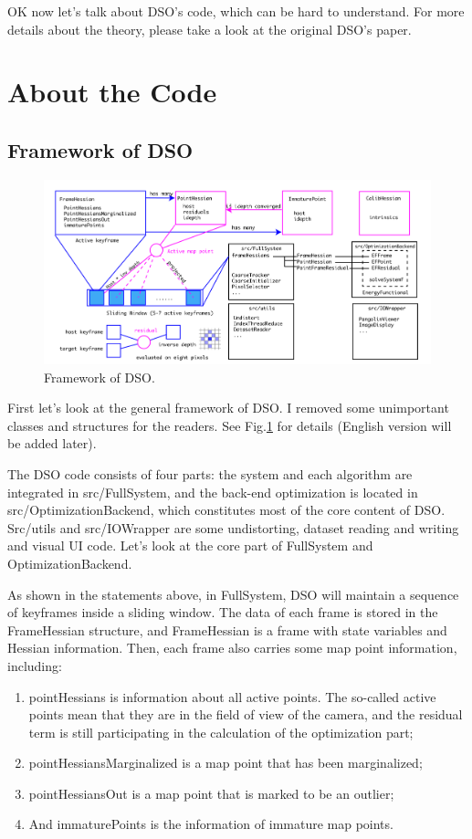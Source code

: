 \documentclass[a4paper,10pt]{article}
\begin{document}
	OK now let's talk about DSO's code, which can be hard to understand. For more details about the theory, please take a look at the original DSO's paper.
	
	\section{About the Code}
	\subsection{Framework of DSO}
	\begin{figure}[htp]
	\centering
	\includegraphics[width=1.0\textwidth]{figs/framework-dso-en}
	\caption{Framework of DSO.}
	\label{fig:framework-dso}
	\end{figure}
	First let's look at the general framework of DSO. I removed some unimportant classes and structures for the readers. See Fig.\ref{fig:framework-dso} for details (English version will be added later).
	
	The DSO code consists of four parts: the system and each algorithm are integrated in src/FullSystem, and the back-end optimization is located in src/OptimizationBackend, which constitutes most of the core content of DSO. Src/utils and src/IOWrapper are some undistorting, dataset reading and writing and visual UI code. Let's look at the core part of FullSystem and OptimizationBackend.
	
	As shown in the statements above, in FullSystem, DSO will maintain a sequence of keyframes inside a sliding window. The data of each frame is stored in the FrameHessian structure, and FrameHessian is a frame with state variables and Hessian information. Then, each frame also carries some map point information, including:
	\begin{enumerate}
	\item pointHessians is information about all active points. The so-called active points mean that they are in the field of view of the camera, and the residual term is still participating in the calculation of the optimization part;
	\item pointHessiansMarginalized is a map point that has been marginalized;
	\item pointHessiansOut is a map point that is marked to be an outlier;
	\item And immaturePoints is the information of immature map points.
	\end{enumerate}
	
\end{document}
